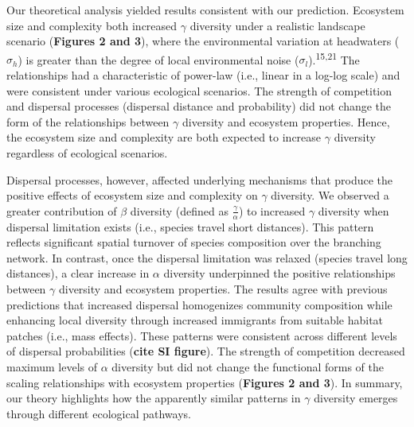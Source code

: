 \documentclass[
]{article}
\begin{document}
Our theoretical analysis yielded results consistent with our prediction.
Ecosystem size and complexity both increased \(\gamma\) diversity under
a realistic landscape scenario (\textbf{Figures 2 and 3}), where the
environmental variation at headwaters (\(\sigma_h\)) is greater than the
degree of local environmental noise
(\(\sigma_l\)).\textsuperscript{15,21} The relationships had a
characteristic of power-law (i.e., linear in a log-log scale) and were
consistent under various ecological scenarios. The strength of
competition and dispersal processes (dispersal distance and probability)
did not change the form of the relationships between \(\gamma\)
diversity and ecosystem properties. Hence, the ecosystem size and
complexity are both expected to increase \(\gamma\) diversity regardless
of ecological scenarios.

Dispersal processes, however, affected underlying mechanisms that
produce the positive effects of ecosystem size and complexity on
\(\gamma\) diversity. We observed a greater contribution of \(\beta\)
diversity (defined as \(\frac{\gamma}{\alpha}\)) to increased \(\gamma\)
diversity when dispersal limitation exists (i.e., species travel short
distances). This pattern reflects significant spatial turnover of
species composition over the branching network. In contrast, once the
dispersal limitation was relaxed (species travel long distances), a
clear increase in \(\alpha\) diversity underpinned the positive
relationships between \(\gamma\) diversity and ecosystem properties. The
results agree with previous predictions that increased dispersal
homogenizes community composition while enhancing local diversity
through increased immigrants from suitable habitat patches (i.e., mass
effects). These patterns were consistent across different levels of
dispersal probabilities (\textbf{cite SI figure}). The strength of
competition decreased maximum levels of \(\alpha\) diversity but did not
change the functional forms of the scaling relationships with ecosystem
properties (\textbf{Figures 2 and 3}). In summary, our theory highlights
how the apparently similar patterns in \(\gamma\) diversity emerges
through different ecological pathways.
\end{document}
